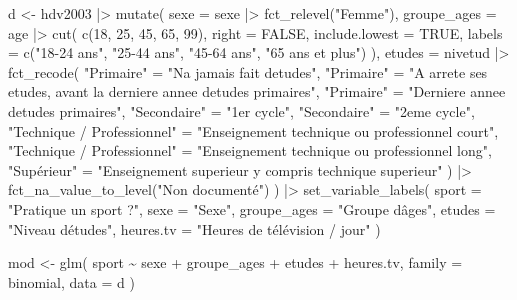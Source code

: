 \documentclass[
  letterpaper,
  DIV=11,
  numbers=noendperiod,
  oneside]{scrreprt}
\newenvironment{Shaded}{\begin{snugshade}}{\end{snugshade}}
\newcommand{\AttributeTok}[1]{\textcolor[rgb]{0.40,0.45,0.13}{#1}}
\newcommand{\ConstantTok}[1]{\textcolor[rgb]{0.56,0.35,0.01}{#1}}
\newcommand{\DecValTok}[1]{\textcolor[rgb]{0.68,0.00,0.00}{#1}}
\newcommand{\FunctionTok}[1]{\textcolor[rgb]{0.28,0.35,0.67}{#1}}
\newcommand{\NormalTok}[1]{\textcolor[rgb]{0.00,0.23,0.31}{#1}}
\newcommand{\OtherTok}[1]{\textcolor[rgb]{0.00,0.23,0.31}{#1}}
\newcommand{\SpecialCharTok}[1]{\textcolor[rgb]{0.37,0.37,0.37}{#1}}
\newcommand{\StringTok}[1]{\textcolor[rgb]{0.13,0.47,0.30}{#1}}
\begin{document}
\begin{Shaded}
\begin{Highlighting}[]
\NormalTok{d }\OtherTok{\textless{}{-}}
\NormalTok{  hdv2003 }\SpecialCharTok{|\textgreater{}} 
  \FunctionTok{mutate}\NormalTok{(}
    \AttributeTok{sexe =}\NormalTok{ sexe }\SpecialCharTok{|\textgreater{}} \FunctionTok{fct\_relevel}\NormalTok{(}\StringTok{"Femme"}\NormalTok{),}
    \AttributeTok{groupe\_ages =}\NormalTok{ age }\SpecialCharTok{|\textgreater{}}
      \FunctionTok{cut}\NormalTok{(}
        \FunctionTok{c}\NormalTok{(}\DecValTok{18}\NormalTok{, }\DecValTok{25}\NormalTok{, }\DecValTok{45}\NormalTok{, }\DecValTok{65}\NormalTok{, }\DecValTok{99}\NormalTok{),}
        \AttributeTok{right =} \ConstantTok{FALSE}\NormalTok{,}
        \AttributeTok{include.lowest =} \ConstantTok{TRUE}\NormalTok{,}
        \AttributeTok{labels =} \FunctionTok{c}\NormalTok{(}\StringTok{"18{-}24 ans"}\NormalTok{, }\StringTok{"25{-}44 ans"}\NormalTok{,}
                   \StringTok{"45{-}64 ans"}\NormalTok{, }\StringTok{"65 ans et plus"}\NormalTok{)}
\NormalTok{      ),}
    \AttributeTok{etudes =}\NormalTok{ nivetud }\SpecialCharTok{|\textgreater{}} 
      \FunctionTok{fct\_recode}\NormalTok{(}
        \StringTok{"Primaire"} \OtherTok{=} \StringTok{"N\textquotesingle{}a jamais fait d\textquotesingle{}etudes"}\NormalTok{,}
        \StringTok{"Primaire"} \OtherTok{=} \StringTok{"A arrete ses etudes, avant la derniere annee d\textquotesingle{}etudes primaires"}\NormalTok{,}
        \StringTok{"Primaire"} \OtherTok{=} \StringTok{"Derniere annee d\textquotesingle{}etudes primaires"}\NormalTok{,}
        \StringTok{"Secondaire"} \OtherTok{=} \StringTok{"1er cycle"}\NormalTok{,}
        \StringTok{"Secondaire"} \OtherTok{=} \StringTok{"2eme cycle"}\NormalTok{,}
        \StringTok{"Technique / Professionnel"} \OtherTok{=} \StringTok{"Enseignement technique ou professionnel court"}\NormalTok{,}
        \StringTok{"Technique / Professionnel"} \OtherTok{=} \StringTok{"Enseignement technique ou professionnel long"}\NormalTok{,}
        \StringTok{"Supérieur"} \OtherTok{=} \StringTok{"Enseignement superieur y compris technique superieur"}
\NormalTok{    ) }\SpecialCharTok{|\textgreater{}} 
    \FunctionTok{fct\_na\_value\_to\_level}\NormalTok{(}\StringTok{"Non documenté"}\NormalTok{)  }
\NormalTok{  ) }\SpecialCharTok{|\textgreater{}} 
  \FunctionTok{set\_variable\_labels}\NormalTok{(}
    \AttributeTok{sport =} \StringTok{"Pratique un sport ?"}\NormalTok{,}
    \AttributeTok{sexe =} \StringTok{"Sexe"}\NormalTok{,}
    \AttributeTok{groupe\_ages =} \StringTok{"Groupe d\textquotesingle{}âges"}\NormalTok{,}
    \AttributeTok{etudes =} \StringTok{"Niveau d\textquotesingle{}études"}\NormalTok{,}
    \AttributeTok{heures.tv =} \StringTok{"Heures de télévision / jour"}
\NormalTok{  )}

\NormalTok{mod }\OtherTok{\textless{}{-}} \FunctionTok{glm}\NormalTok{(}
\NormalTok{  sport }\SpecialCharTok{\textasciitilde{}}\NormalTok{ sexe }\SpecialCharTok{+}\NormalTok{ groupe\_ages }\SpecialCharTok{+}\NormalTok{ etudes }\SpecialCharTok{+}\NormalTok{ heures.tv,}
  \AttributeTok{family =}\NormalTok{ binomial,}
  \AttributeTok{data =}\NormalTok{ d}
\NormalTok{)}
\end{Highlighting}
\end{Shaded}
\end{document}
